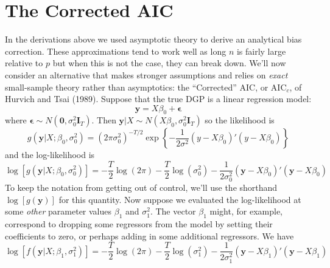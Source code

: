 \documentclass[12pt]{article}
\theoremstyle{definition}
\begin{document}
\section{The Corrected AIC}
In the derivations above we used asymptotic theory to derive an analytical bias correction. These approximations tend to work well as long $n$ is fairly large relative to $p$ but when this is not the case, they can break down. We'll now consider an alternative that makes stronger assumptions and relies on \emph{exact} small-sample theory rather than asymptotics: the ``Corrected'' AIC, or AIC$
_c$, of Hurvich and Tsai (1989). Suppose that the true DGP is a linear regression model:
	$$\textbf{y} = X\beta_0 + \boldsymbol{\epsilon}$$
where $\mathbf{\epsilon} \sim N(\mathbf{0}, \sigma_0^2 \mathbf{I}_T)$. Then $\mathbf{y}|X \sim N(X\beta_0, \sigma_0^2 \mathbf{I}_T)$ so the likelihood is
	$$g(\textbf{y}|X;\beta_0, \sigma^2_0) = \left(2\pi\sigma_0^2\right)^{-T/2} \exp\left\{ -\frac{1}{2\sigma^2}(y - X\beta_0)'(y - X\beta_0)\right\}$$
and the log-likelihood is
	$$\log\left[g(\textbf{y}|X;\beta_0, \sigma_0^2)\right] = -\frac{T}{2}\log(2\pi) -\frac{T}{2} \log(\sigma^2_0) - \frac{1}{2\sigma_0^2}\left(\textbf{y} - X\beta_0\right)'\left(\textbf{y} -X\beta_0\right)$$
To keep the notation from getting out of control, we'll use the shorthand $\log[g(\mathbf{y})]$ for this quantity. Now suppose we evaluated the log-likelihood at some \emph{other} parameter values $\beta_1$ and $\sigma^2_1$. The vector $\beta_1$ might, for example, correspond to dropping some regressors from the model by setting their coefficients to zero, or perhaps adding in some additional regressors. We have
	$$\log[f(\textbf{y}|X;\beta_1, \sigma_1^2)] =  -\frac{T}{2}\log(2\pi) -\frac{T}{2} \log(\sigma^2_1) - \frac{1}{2\sigma_1^2}\left(\textbf{y} - X\beta_1\right)'\left(\textbf{y} -X\beta_1\right)$$
\end{document}
